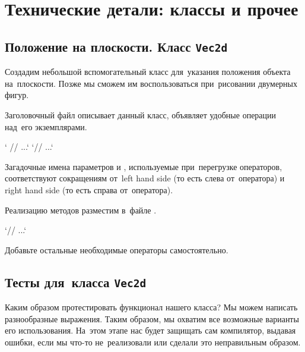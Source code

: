 
\chapter{Технические детали: классы и прочее}

\section{Положение на плоскости. Класс \texttt{Vec2d}}
Создадим небольшой вспомогательный класс  для~указания положения объекта на~плоскости. Позже мы сможем им воспользоваться при~рисовании двумерных фигур.

Заголовочный файл  описывает данный класс, объявляет удобные операции над~его экземплярами.

\cpp`  // ...`
\cpp`// ...`

Загадочные имена параметров  и , используемые при~перегрузке операторов, соответствуют сокращениям от~\textenglish{left hand side} (то есть слева от~оператора) и \textenglish{right hand side} (то есть справа от~оператора).

Реализацию методов разместим в~файле .

\cpp`// ...`

Добавьте остальные необходимые операторы самостоятельно.



\section{Тесты для~класса \texttt{Vec2d}}
Каким образом протестировать функционал нашего класса? Мы можем написать разнообразные выражения. Таким образом, мы охватим все возможные варианты его использования. На~этом этапе нас будет защищать сам компилятор, выдавая ошибки, если мы что-то не~реализовали или сделали это неправильным образом.

